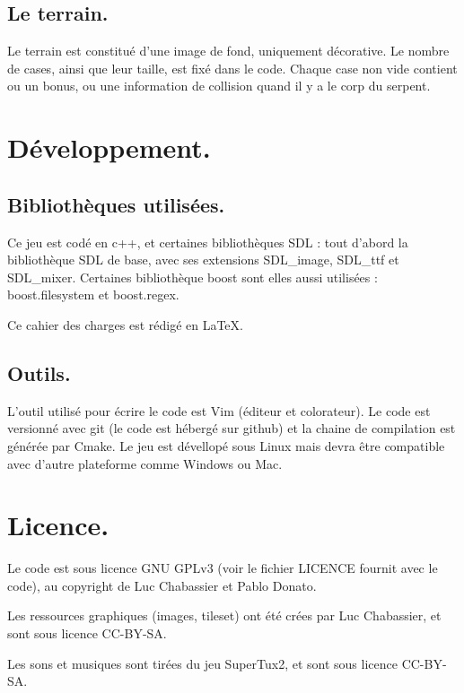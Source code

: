 \documentclass{article}
\begin{document}
\subsection{Le terrain.}
Le terrain est constitué d'une image de fond, uniquement décorative. Le nombre de cases, ainsi que leur taille, est fixé dans le code. Chaque case non vide contient ou un bonus, ou une information de collision quand il y a le corp du serpent.

\section{Développement.}
\subsection{Bibliothèques utilisées.}
Ce jeu est codé en c++, et certaines bibliothèques SDL : tout d'abord la bibliothèque SDL de base, avec ses extensions SDL\_image, SDL\_ttf et SDL\_mixer. Certaines bibliothèque boost sont elles aussi utilisées : boost.filesystem et boost.regex.

Ce cahier des charges est rédigé en \LaTeX.

\subsection{Outils.}
L'outil utilisé pour écrire le code est Vim (éditeur et colorateur). Le code est versionné avec git (le code est hébergé sur github) et la chaine de compilation est générée par Cmake. Le jeu est dévellopé sous Linux mais devra être compatible avec d'autre plateforme comme Windows ou Mac.

\section{Licence.}
Le code est sous licence GNU GPLv3 (voir le fichier LICENCE fournit avec le code), au copyright de Luc Chabassier et Pablo Donato.

Les ressources graphiques (images, tileset) ont été crées par Luc Chabassier, et sont sous licence CC-BY-SA.

Les sons et musiques sont tirées du jeu SuperTux2, et sont sous licence CC-BY-SA.
\end{document}
